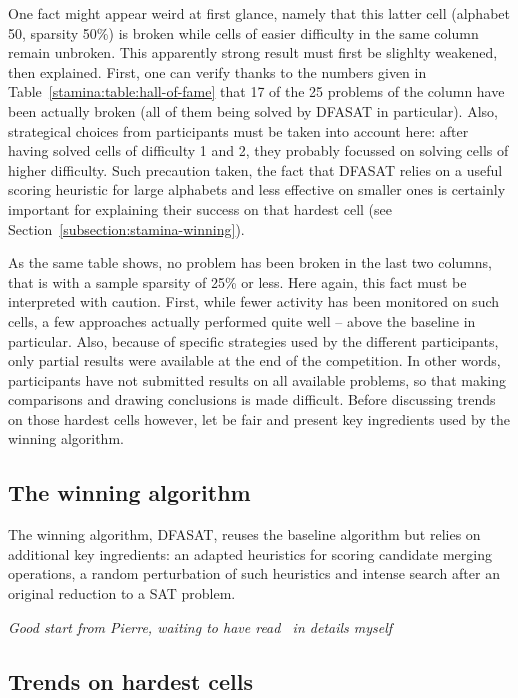 One fact might appear weird at first glance, namely that this latter cell (alphabet 50, sparsity 50\%) is broken while cells of easier difficulty in the same column remain unbroken. This apparently strong result must first be slighlty weakened, then explained. First, one can verify thanks to the numbers given in Table~\ref{stamina:table:hall-of-fame} that 17 of the 25 problems of the column have been actually broken (all of them being solved by DFASAT in particular). Also, strategical choices from participants must be taken into account here: after having solved cells of difficulty 1 and 2, they probably focussed on solving cells of higher difficulty. Such precaution taken, the fact that DFASAT relies on a useful scoring heuristic for large alphabets and less effective on smaller ones is certainly important for explaining their success on that hardest cell (see Section~\ref{subsection:stamina-winning}).

As the same table shows, no problem has been broken in the last two columns, that is with a sample sparsity of 25\% or less. Here again, this fact must be interpreted with caution. First, while fewer activity has been monitored on such cells, a few approaches actually performed quite well -- above the baseline in particular. Also, because of specific strategies used by the different participants, only partial results were available at the end of the competition. In other words, participants have not submitted results on all available problems, so that making comparisons and drawing conclusions is made difficult. Before discussing trends on those hardest cells however, let be fair and present key ingredients used by the winning algorithm.

\subsection{The winning algorithm\label{subsection:stamina-winning}}

The winning algorithm, DFASAT, reuses the baseline algorithm but relies on additional key ingredients: an adapted heuristics for scoring candidate merging operations, a random perturbation of such heuristics and intense search after an original reduction to a SAT problem. 

\noindent \emph{Good start from Pierre, waiting to have read~\cite{Heule10} in details myself}

\subsection{Trends on hardest cells}


